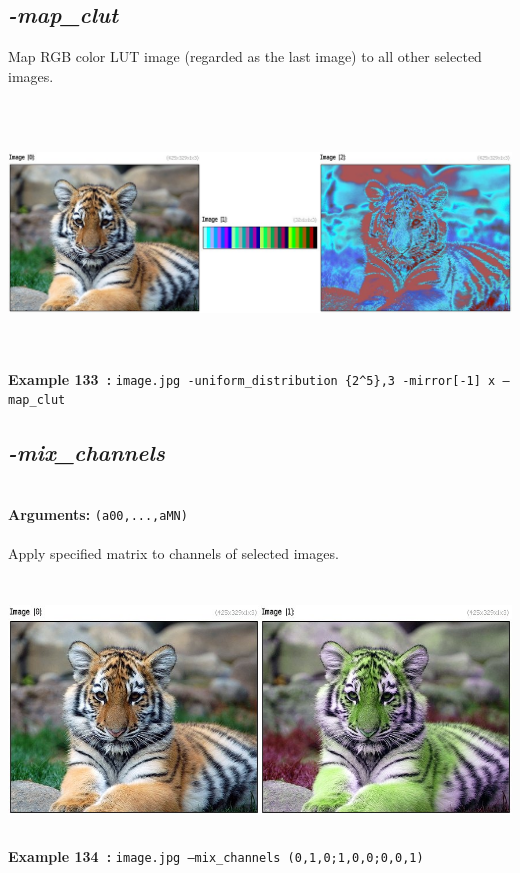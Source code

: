 \documentclass[a4paper,11pt,twoside]{book}
\begin{document}
\subsection{\emph{-map\_clut} }\vspace*{-0.5em}
Map RGB color LUT image (regarded as the last image) to all other selected images.
\begin{center}\includegraphics[keepaspectratio=true,height=7cm,width=\textwidth]{img/gmic_def133.jpg}\\
{\footnotesize \textbf{Example 133~:} \texttt{image.jpg -uniform\_distribution \{2\textasciicircum 5\},3 -mirror[-1] x --map\_clut}}
\end{center}

\subsection{\emph{-mix\_channels} }\vspace*{-0.5em}
~\\\textbf{Arguments: } 
{\small \texttt{(a00,...,aMN)}}\\~\\
Apply specified matrix to channels of selected images.
\begin{center}\includegraphics[keepaspectratio=true,height=7cm,width=\textwidth]{img/gmic_def134.jpg}\\
{\footnotesize \textbf{Example 134~:} \texttt{image.jpg --mix\_channels (0,1,0;1,0,0;0,0,1)}}
\end{center}
\end{document}
